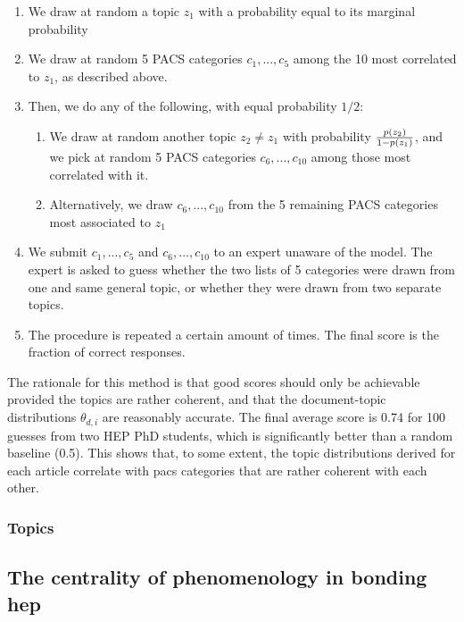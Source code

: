 \documentclass[smallextended]{svjour3}
\begin{document}
\begin{enumerate}
    \item We draw at random a topic $z_1$ with a probability equal to its marginal probability 
    \item We draw at random 5 PACS categories $c_1,...,c_5$ among the 10 most correlated to $z_1$, as described above.
    \item Then, we do any of the following, with equal probability $1/2$:
    \begin{enumerate}
        \item We draw at random another topic $z_2\neq z_1$ with probability $p(z_2)\over 1-p(z_1)$, and we pick at random 5 PACS categories $c_6,...,c_{10}$ among those most correlated with it.
        \item Alternatively, we draw  $c_6,...,c_{10}$ from the 5 remaining PACS categories most associated to $z_1$
    \end{enumerate}
    \item We submit $c_1, ..., c_5$ and $c_6, ..., c_{10}$ to an expert unaware of the model. The expert is asked to guess whether the two lists of 5 categories were drawn from one and same general topic, or whether they were drawn from two separate topics.
    \item The procedure is repeated a certain amount of times. The final score is the fraction of correct responses.
\end{enumerate}

The rationale for this method is that good scores should only be achievable provided the topics are rather coherent, and that the document-topic distributions $\theta_{d,i}$ are reasonably accurate. The final average score is 0.74 for 100 guesses from two HEP PhD students, which is significantly better than a random baseline (0.5). This shows that, to some extent, the topic distributions derived for each article correlate with \gls{pacs} categories that are rather coherent with each other.


\subsubsection{Topics}


\fontsize{6}{7}\selectfont\normalsize
\fontsize{6}{7}\selectfont\normalsize

\subsection{\label{appendix:phenomenology_centrality}The centrality of phenomenology in bonding \gls{hep}}
\end{document}
